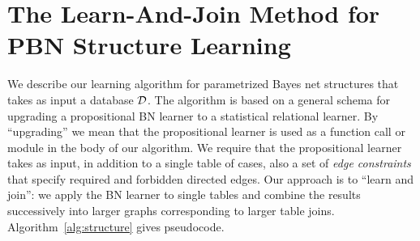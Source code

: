 \documentclass[letterpaper]{article}
\begin{document}
%



% 

\section{The Learn-And-Join Method for PBN Structure Learning}

We describe our learning algorithm for parametrized Bayes net structures that takes as input a database $\mathcal{D}$.
The algorithm is based on a general schema for upgrading a propositional BN learner to a statistical relational learner. %
By ``upgrading'' we mean that the propositional learner is used as a function call or module in the body of our algorithm. We require that the propositional learner takes as input, in addition to a single table of cases, also a set of {\em edge constraints} that specify required and forbidden directed edges.
Our approach is to ``learn and join'': we apply the BN learner to single tables and combine the results successively into larger graphs corresponding to larger table joins. Algorithm~\ref{alg:structure} gives pseudocode.
\end{document}

